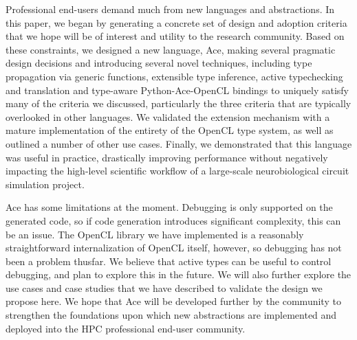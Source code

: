 \documentclass[9pt,preprint]{sigplanconf}
\begin{document}
Professional end-users demand much from new languages and abstractions. In this paper, we began by generating a concrete set of design and adoption criteria that we hope will be of interest and utility to the research community. Based on these constraints, we designed a new language, Ace, making several pragmatic design decisions and introducing several novel techniques, including type propagation via generic functions, extensible type inference, active typechecking and translation and type-aware Python-Ace-OpenCL bindings to uniquely satisfy many of the criteria we discussed, particularly the three criteria that are typically overlooked in other languages. We validated the extension mechanism with a mature implementation of  the entirety of the OpenCL type system, as well as outlined a number of other use cases. Finally, we demonstrated that this language was useful in practice, drastically improving performance without negatively impacting the high-level scientific workflow of a large-scale neurobiological circuit simulation project. 

Ace has some limitations at the moment. Debugging is only supported on the generated code, so if code generation introduces significant complexity, this can be an issue. The OpenCL library we have implemented is a reasonably straightforward internalization of OpenCL itself, however, so debugging has not been a problem thusfar. We believe that active types can be useful to control debugging, and plan to explore this in the future. We will also further explore the use cases and case studies that we have described to validate the design we propose here. We hope that Ace will be developed further by the community to strengthen the foundations upon which new abstractions are implemented and deployed into the HPC professional end-user community.







\end{document}
